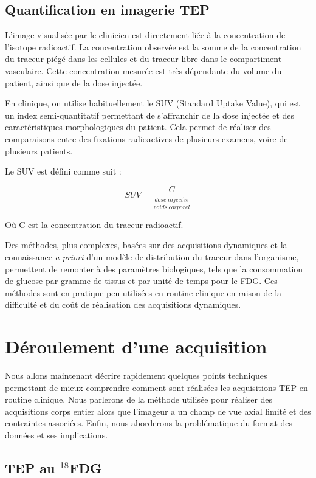 \section{Quantification en imagerie TEP}

L'image visualisée par le clinicien est directement liée à  la concentration de l'isotope radioactif. La concentration observée est la somme de la concentration du traceur piégé dans les cellules et du traceur libre dans le compartiment vasculaire. Cette concentration mesurée est très dépendante du volume du patient, ainsi que de la dose injectée.

En clinique, on utilise habituellement le SUV (Standard Uptake Value), qui est un index semi-quantitatif permettant de s'affranchir de la dose injectée et des caractéristiques morphologiques du patient. Cela permet de réaliser des comparaisons entre des fixations radioactives de plusieurs examens, voire de plusieurs patients.

Le SUV est défini comme suit :

\begin{equation}
SUV=\frac{C}{ \frac{dose~inject\acute{e}e}{poids~corporel} }
\end{equation}

Où C est la concentration du traceur radioactif.

Des méthodes, plus complexes, basées sur des acquisitions dynamiques et la connaissance \textit{a priori} d'un modèle de distribution du traceur dans l'organisme, permettent de remonter à des paramètres biologiques, tels que la consommation de glucose par gramme de tissus et par unité de temps pour le FDG. Ces méthodes sont en pratique peu utilisées en routine clinique en raison de la difficulté et du coût de réalisation des acquisitions dynamiques.

\chapter{Déroulement d'une acquisition}


Nous allons maintenant décrire rapidement quelques points techniques permettant de mieux comprendre comment sont réalisées les acquisitions TEP en routine clinique. Nous parlerons de la méthode utilisée pour réaliser des acquisitions corps entier alors que l'imageur a un champ de vue axial limité et des contraintes associées. Enfin, nous aborderons la problématique du format des données et ses implications.

\section{TEP au $^{18}$FDG}


